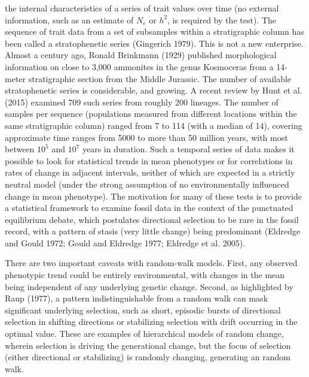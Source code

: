 \documentclass{article}
\begin{document}
the internal characteristics of a series of trait values over time (no external information, such as an estimate of  $ N_e $ or  $ h^2 $, is required by the test). The sequence of trait data from a set of subsamples within a stratigraphic column has been called a stratophenetic series (Gingerich 1979). This is not a new enterprise. Almost a century ago, Ronald Brinkmann (1929) published morphological information on close to 3,000 ammonites in the genus Kosmoceras from a 14-meter stratigraphic section from the Middle Jurassic. The number of available stratophenetic series is considerable, and growing. A recent review by Hunt et al. (2015) examined 709 such series from roughly 200 lineages. The number of samples per sequence (populations measured from different locations within the same stratigraphic column) ranged from 7 to 114 (with a median of 14), covering approximate time ranges from 5000 to more than 50 million years, with most between  $ 10^5 $ and  $ 10^7 $ years in duration. Such a temporal series of data makes it possible to look for statistical trends in mean phenotypes or for correlations in rates of change in adjacent intervals, neither of which are expected in a strictly neutral model (under the strong assumption of no environmentally influenced change in mean phenotype). The motivation for many of these tests is to provide a statistical framework to examine fossil data in the context of the punctuated equilibrium debate, which postulates directional selection to be rare in the fossil record, with a pattern of stasis (very little change) being predominant (Eldredge and Gould 1972; Gould and Eldredge 1977; Eldredge et al. 2005).

There are two important caveats with random-walk models. First, any observed phenotypic trend could be entirely environmental, with changes in the mean being independent of any underlying genetic change. Second, as highlighted by Raup (1977), a pattern indistinguishable from a random walk can mask significant underlying selection, such as short, episodic bursts of directional selection in shifting directions or stabilizing selection with drift occurring in the optimal value. These are examples of hierarchical models of random change, wherein selection is driving the generational change, but the focus of selection (either directional or stabilizing) is randomly changing, generating an random walk.
\end{document}

